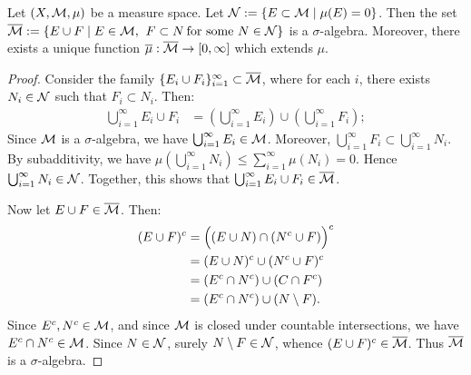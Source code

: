     \begin{theorem}
        Let $(X,\cM,\mu)$ be a measure space. Let $\cN := \{E \subset \cM \mid \mu(E) = 0\}$. Then the set $\overline{\cM} := \{E \cup F \mid E \in \cM, \h4 F \subset N \h2\text{for some $N \in \cN$}\}$ is a $\sigma$-algebra. Moreover, there exists a unique function $\overline{\mu}:\overline{\cM} \rightarrow [0,\infty]$ which extends $\mu$.
    \end{theorem}
        \begin{proof}

            Consider the family $\{E_i \cup F_i\}_{i = 1}^\infty \subset \overline{\cM}$, where for each $i$, there exists $N_i \in \cN$ such that $F_i \subset N_i$. Then:
                \begin{equation*}
                \begin{split}
                    \bigcup_{i = 1}^\infty E_i \cup F_i 
                    & = \left(\bigcup_{i = 1}^\infty E_i\right) \cup \left(\bigcup_{i = 1}^\infty F_i\right);
                \end{split}
                \end{equation*}
            Since $\cM$ is a $\sigma$-algebra, we have $\bigcup_{i = 1}^\infty E_i \in \cM$. Moreover, $\bigcup_{i = 1}^\infty F_i \subset \bigcup_{i = 1}^\infty N_i$. By subadditivity, we have $\mu \left( \bigcup_{i = 1}^\infty N_i \right) \leq \sum_{i = 1}^\infty \mu(N_i) = 0$. Hence $\bigcup_{i = 1}^\infty N_i \in \cN$. Together, this shows that $\bigcup_{i = 1}^\infty E_i \cup F_i \in \overline{\cM}$.

            Now let $E \cup F \in \overline{\cM}$. Then:
                \begin{equation*}
                \begin{split}
                    (E \cup F)^c 
                    & = \Bigl( (E \cup N) \cap (N^c \cup F)\Bigr)^c \\
                    & = (E \cup N)^c \cup (N^c \cup F)^c \\
                    & =  (E^c \cap N^c) \cup (C \cap F^c) \\
                    & = (E^c \cap N^c) \cup (N \setminus F).
                \end{split}
                \end{equation*}
            Since $E^c,N^c \in \cM$, and since $\cM$ is closed under countable intersections, we have $E^c \cap N^c \in \cM$. Since $N \in \cN$, surely $N \setminus F \in \cN$, whence $(E \cup F)^c \in \overline{\cM}$. Thus $\overline{\cM}$ is a $\sigma$-algebra.


\end{proof}

